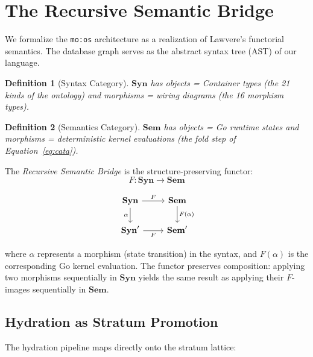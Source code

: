 \documentclass[submission,copyright,creativecommons]{eptcs}
\newtheorem{definition}{Definition}
\begin{document}
\section{The Recursive Semantic Bridge}
\label{sec:bridge}

We formalize the \texttt{mo:os} architecture as a realization of Lawvere's
functorial semantics. The database graph serves as the abstract syntax tree
(AST) of our language.

\begin{definition}[Syntax Category]
$\mathbf{Syn}$ has objects = Container types (the 21 kinds of the ontology)
and morphisms = wiring diagrams (the 16 morphism types).
\end{definition}

\begin{definition}[Semantics Category]
$\mathbf{Sem}$ has objects = Go runtime states and morphisms = deterministic
kernel evaluations (the fold step of Equation~\ref{eq:cata}).
\end{definition}

The \emph{Recursive Semantic Bridge} is the structure-preserving functor:
\begin{equation}
F\colon \mathbf{Syn} \to \mathbf{Sem}
\end{equation}

\begin{equation}
\begin{tikzcd}
\mathbf{Syn} \arrow[r, "F"] \arrow[d, "\alpha"'] & \mathbf{Sem} \arrow[d, "F(\alpha)"] \\
\mathbf{Syn}' \arrow[r, "F"'] & \mathbf{Sem}'
\end{tikzcd}
\end{equation}

where $\alpha$ represents a morphism (state transition) in the syntax, and
$F(\alpha)$ is the corresponding Go kernel evaluation. The functor preserves
composition: applying two morphisms sequentially in $\mathbf{Syn}$ yields the
same result as applying their $F$-images sequentially in $\mathbf{Sem}$.



\subsection{Hydration as Stratum Promotion}

The hydration pipeline maps directly onto the stratum lattice:
\end{document}
